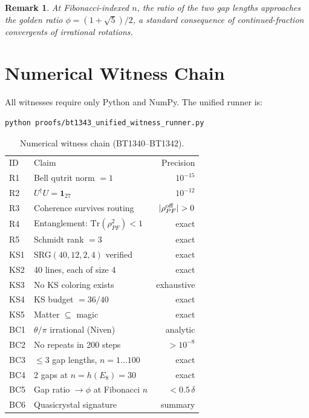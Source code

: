 \documentclass[prl,twocolumn,showpacs,superscriptaddress,longbibliography]{revtex4-2}
\newtheorem{remark}{Remark}
\begin{document}
\begin{remark}
At Fibonacci-indexed $n$, the ratio of the two gap lengths
approaches the golden ratio $\phi = (1+\sqrt{5})/2$,
a standard consequence of continued-fraction convergents
of irrational rotations.
\end{remark}

\section{Numerical Witness Chain}\label{sec:witnesses}

All witnesses require only Python and NumPy.
The unified runner is:
\begin{verbatim}
python proofs/bt1343_unified_witness_runner.py
\end{verbatim}

\begin{table}[h]
\caption{\label{tab:witnesses}Numerical witness chain (BT1340--BT1342).}
\begin{ruledtabular}
\begin{tabular}{llr}
\textrm{ID} & \textrm{Claim} & \textrm{Precision}\\
\colrule
R1 & Bell qutrit norm $= 1$ & $10^{-15}$\\
R2 & $U^\dagger U = \mathbf{1}_{27}$ & $10^{-12}$\\
R3 & Coherence survives routing & $|\rho_{PF}^{\rm off}|>0$\\
R4 & Entanglement: $\mathrm{Tr}(\rho_{PF}^2)<1$ & exact\\
R5 & Schmidt rank $= 3$ & exact\\
KS1 & SRG$(40,12,2,4)$ verified & exact\\
KS2 & 40 lines, each of size 4 & exact\\
KS3 & No KS coloring exists & exhaustive\\
KS4 & KS budget $= 36/40$ & exact\\
KS5 & Matter $\subseteq$ magic & exact\\
BC1 & $\theta/\pi$ irrational (Niven) & analytic\\
BC2 & No repeats in 200 steps & $>10^{-8}$\\
BC3 & $\leq 3$ gap lengths, $n=1\ldots100$ & exact\\
BC4 & 2 gaps at $n=h(E_8)=30$ & exact\\
BC5 & Gap ratio $\to \phi$ at Fibonacci $n$ & $<0.5\,\delta$\\
BC6 & Quasicrystal signature & summary\\
\end{tabular}
\end{ruledtabular}
\end{table}
\end{document}

